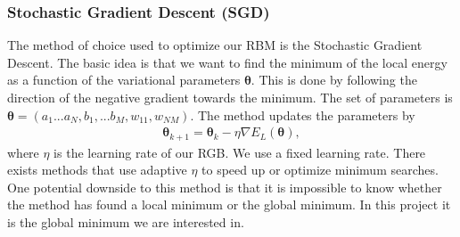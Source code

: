
\subsubsection{Stochastic Gradient Descent (SGD)} \label{sec_SGD}
The method of choice used to optimize our RBM is the Stochastic Gradient Descent. The basic idea is that we want to find the minimum of the local energy as a function of the variational parameters $\boldsymbol{\theta}$. This is done by following the direction of the negative gradient towards the minimum. The set of parameters is $\boldsymbol{\theta} = (a_1...a_N,b_1,...b_M,w_{11},w_{NM})$. The method updates the parameters by 
\begin{align}
	\label{parameter}
\boldsymbol{\theta}_{k+1} = \boldsymbol{\theta}_k - \eta \nabla E_L(\boldsymbol{\theta}),
\end{align}
where $\eta$ is the learning rate of our RGB. We use a fixed learning rate. There exists methods that use adaptive $\eta$ to speed up or optimize minimum searches. One potential downside to this method is that it is impossible to know whether the method has found a local minimum or the global minimum. In this project it is the global minimum we are interested in.

